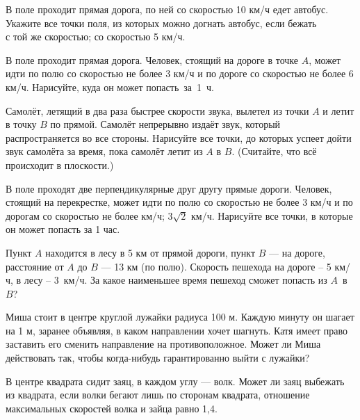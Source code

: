 \documentclass[a4paper, 12pt]{article}
\begin{document}



В поле проходит прямая дорога, по ней со скоростью 10 км/ч едет автобус. Укажите все точки поля, из которых можно догнать автобус, если бежать\\
 с той же скоростью;
 со скоростью 5 км/ч.

В поле проходит прямая дорога. Человек, стоящий на дороге в точке $A$, может  идти по полю со скоростью не более 3 км/ч и по дороге со скоростью не более 6 км/ч. Нарисуйте, куда он может попасть~за~1~ч.

Самолёт, летящий в два раза быстрее скорости звука, вылетел из точки $A$ и летит в точку $B$ по прямой. Самолёт непрерывно издаёт звук, который распространяется во все стороны. Нарисуйте все точки, до которых успеет дойти звук самолёта за время, пока самолёт летит из $A$ в $B$.
(Считайте, что всё происходит в плоскости.)


В поле проходят две перпендикулярные друг другу прямые дороги. Человек, стоящий на перекрестке, может идти по полю со скоростью не более 3 км/ч и по дорогам со скоростью не более  км/ч;  $3\sqrt2$ км/ч. Нарисуйте все точки, в которые он может попасть за 1 час.

Пункт $A$ находится в лесу в 5 км от прямой дороги, пункт $B$ --- на дороге, расстояние от $A$ до $B$ --- 13 км (по полю). Скорость пешехода на дороге – 5 км/ч, в лесу – 3~км/ч. За какое наименьшее время пешеход сможет попасть из $A$~в~$B$?


Миша стоит в центре круглой лужайки радиуса 100 м.
Каждую минуту он шагает на 1 м, заранее объявляя, в
каком направлении хочет шагнуть.
Катя имеет право заставить его сменить направление
на противоположное. Может ли Миша действовать так, чтобы
когда-нибудь гарантированно выйти с лужайки?

В центре квадрата сидит заяц, в каждом %
углу --- %
волк. Может ли заяц выбежать из квадрата, если волки %
бегают лишь
по сторонам квадрата,
отношение максимальных скоростей волка и зайца равно 1,4.
\end{document}
